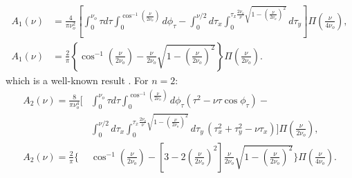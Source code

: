 \documentclass[]{osa-article}
\begin{document}
\begin{align}
  A_1(\nu) &= \frac{4}{\pi\nu_o^{2}}\left[\int_0^{\nu_o}\tau d\tau\int_0^{\cos^{-1}\left(\frac{\nu}{2\nu_o}\right)}d\phi_{\tau} - \int_{0}^{\nu/2}d\tau_x\int_0^{\tau_x\frac{2\nu_o}{\nu}\sqrt{1 - \left(\frac{\nu}{2\nu_o}\right)^2}}d\tau_y\right]\Pi\left(\frac{\nu}{4\nu_o}\right),\\
  A_1(\nu) &= \frac{2}{\pi}\left\{\cos^{-1}\left(\frac{\nu}{2\nu_o}\right) - \frac{\nu}{2\nu_o}\sqrt{1 - \left(\frac{\nu}{2\nu_o}\right)^2}\right\}\Pi\left(\frac{\nu}{2\nu_o}\right).
\end{align}
which is a well-known result \cite{goodman1996, mertz2009}. For $n=2$:
\begin{align}
  A_2(\nu) = \frac{8}{\pi\nu_o^{4}}\Bigg[&\int_0^{\nu_o}\tau d\tau\int_0^{\cos^{-1}\left(\frac{\nu}{2\nu_o}\right)}d\phi_{\tau}(\tau^2 - \nu\tau\cos\phi_{\tau}) - \\ &\int_{0}^{\nu/2}d\tau_x\int_0^{\tau_x\frac{2\nu_o}{\nu}\sqrt{1 - \left(\frac{\nu}{2\nu_o}\right)^2}}d\tau_y\, (\tau_x^2 + \tau_y^2 - \nu\tau_x)\Bigg]\Pi\left(\frac{\nu}{2\nu_o}\right),\\
  A_2(\nu) = \frac{2}{\pi}\Bigg\{&\cos^{-1}\left(\frac{\nu}{2\nu_o}\right) - \left[3 - 2\left(\frac{\nu}{2\nu_o}\right)^2\right]\frac{\nu}{2\nu_o}\sqrt{1 - \left(\frac{\nu}{2\nu_o}\right)^2}\Bigg\}\Pi\left(\frac{\nu}{4\nu_o}\right). 
\end{align}
\end{document}
